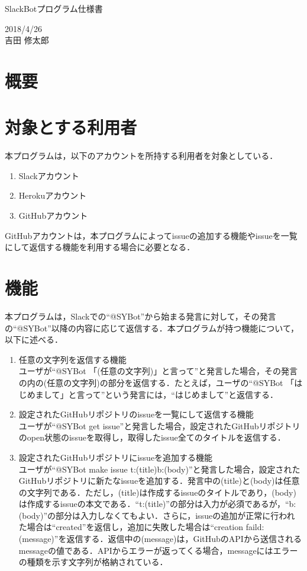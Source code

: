 \documentclass[12pt]{jsarticle}
\begin{document}
\begin{center}
{\LARGE SlackBotプログラム仕様書}
\end{center}

\begin{flushright}
  2018/4/26\\
  吉田 修太郎
\end{flushright}
\section{概要}
\label{sec:introduction}
\section{対象とする利用者}
本プログラムは，以下のアカウントを所持する利用者を対象としている．
\begin{enumerate}
\item Slackアカウント
\item Herokuアカウント
\item GitHubアカウント
\end{enumerate}
GitHubアカウントは，本プログラムによってissueの追加する機能やissueを一覧にして返信する機能を利用する場合に必要となる．
\section{機能}
本プログラムは，Slackでの``@SYBot''から始まる発言に対して，その発言の``@SYBot''以降の内容に応じて返信する．本プログラムが持つ機能について，以下に述べる．
\begin{enumerate}
\item 任意の文字列を返信する機能\\
  ユーザが``@SYBot 「(任意の文字列)」と言って''と発言した場合，その発言の内の(任意の文字列)の部分を返信する．たとえば，ユーザの``@SYBot 「はじめまして」と言って''という発言には，``はじめまして''と返信する．
\item 設定されたGitHubリポジトリのissueを一覧にして返信する機能\\
  ユーザが``@SYBot get issue''と発言した場合，設定されたGitHubリポジトリのopen状態のissueを取得し，取得したissue全てのタイトルを返信する．
\item 設定されたGitHubリポジトリにissueを追加する機能\\
  ユーザが``@SYBot make issue t:(title)b:(body)''と発言した場合，設定されたGitHubリポジトリに新たなissueを追加する．発言中の(title)と(body)は任意の文字列である．ただし，(title)は作成するissueのタイトルであり，(body)は作成するissueの本文である．``t:(title)''の部分は入力が必須であるが，``b:(body)''の部分は入力しなくてもよい．さらに，issueの追加が正常に行われた場合は``created''を返信し，追加に失敗した場合は``creation faild:(message)''を返信する．返信中の(message)は，GitHubのAPIから送信されるmessageの値である．APIからエラーが返ってくる場合，messageにはエラーの種類を示す文字列が格納されている．
\end{enumerate}
\end{document}
